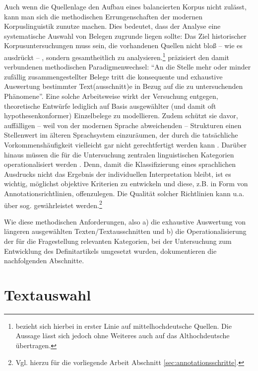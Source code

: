 Auch wenn die Quellenlage den Aufbau eines balancierten Korpus nicht zulässt, kann man sich die methodischen Errungenschaften der modernen Korpuslinguistik zunutze machen. Dies bedeutet, dass der Analyse eine systematische Auswahl von Belegen zugrunde liegen sollte: Das Ziel historischer Korpusuntersuchungen muss sein, die vorhandenen Quellen nicht bloß -- wie es \textcite[1310]{Wegera2000} ausdrückt -- , sondern gesamtheitlich zu analysieren.\footnote{\textcite{Wegera2000} bezieht sich hierbei in erster Linie auf mittelhochdeutsche Quellen. Die Aussage lässt sich jedoch ohne Weiteres auch auf das Althochdeutsche übertragen.} \textcite[382]{Fleischer2015} präzisiert den damit verbundenen methodischen Paradigmenwechsel:
"`An die Stelle mehr oder minder zufällig zusammengestellter Belege tritt die konsequente und exhaustive Auswertung bestimmter Text(ausschnitt)e in Bezug auf die zu untersuchenden Phänomene"'. Eine solche Arbeitsweise wirkt der Versuchung entgegen, theoretische Entwürfe lediglich auf Basis ausgewählter (und damit oft hypothesenkonformer) Einzelbelege zu modellieren. Zudem schützt sie davor, auffälligen -- weil von der modernen Sprache abweichenden -- Strukturen einen Stellenwert im älteren Sprachsystem einzuräumen, der durch die tatsächliche Vorkommenshäufigkeit vielleicht gar nicht gerechtfertigt werden kann \parencite[383]{Fleischer2015}. Darüber hinaus müssen die für die Untersuchung zentralen linguistischen Kategorien operationalisiert werden  \parencite[113--116]{Lemnitzer2015}. Denn, damit die Klassifizierung eines sprachlichen Ausdrucks nicht das Ergebnis der individuellen Interpretation bleibt, ist es wichtig, möglichst objektive Kriterien zu entwickeln und diese, z.B. in Form von Annotationsrichtlinien, offenzulegen. Die Qualität solcher Richtlinien kann u.a. über sog.  gewährleistet werden.\footnote{Vgl. hierzu für die vorliegende Arbeit Abschnitt \ref{sec:annotationsschritte}.} 

Wie diese methodischen Anforderungen, also a) die exhaustive Auswertung von längeren ausgewählten Texten/Textausschnitten und b) die Operationalisierung der für die Fragestellung relevanten Kategorien, bei der Untersuchung zum Entwicklung des Definitartikels umgesetzt wurden, dokumentieren die nachfolgenden Abschnitte.


\section{Textauswahl}\label{sec:textauswahl}

